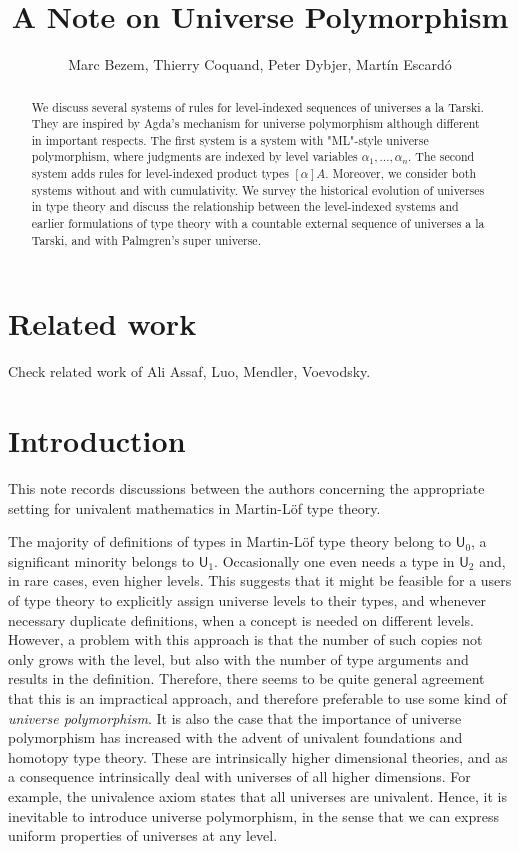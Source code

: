 \documentclass[10pt,a4paper]{article}
\newcommand{\U}{\mathsf{U}}
\begin{document}
\title{A Note on Universe Polymorphism}

\author{Marc Bezem, Thierry Coquand, Peter Dybjer, Mart\'in Escard\'o}
\date{}
\maketitle

\begin{abstract}
We discuss several systems of rules for level-indexed sequences of universes a la Tarski. They are inspired by Agda's mechanism for universe polymorphism although different in important respects. The first system is a system with "ML"-style universe polymorphism, where judgments are indexed by level variables $\alpha_1, \ldots, \alpha_n$. The second system adds rules for level-indexed product types $[\alpha]A$. Moreover, we consider both systems without and with cumulativity. We survey the historical evolution of universes in type theory and discuss the relationship between the level-indexed systems and earlier formulations of type theory with a countable external sequence of universes a la Tarski, and with Palmgren's super universe. 
\end{abstract}

\section{Related work}

Check related work of Ali Assaf, Luo, Mendler, Voevodsky.

\section{Introduction}

This note records discussions between the authors concerning the appropriate setting for univalent mathematics in Martin-Löf type theory. 

The majority of definitions of types in Martin-Löf type theory belong to $\U_0$, a significant minority belongs to $\U_1$. Occasionally one even needs a type in $\U_2$ and, in rare cases, even higher levels. This suggests that it might be feasible for a users of type theory to explicitly assign universe levels to their types, and whenever necessary duplicate definitions, when a concept is needed on different levels. However, a problem with this approach is that the number of such copies not only grows with the level, but also with the number of type arguments and results in the definition. Therefore, there seems to be quite general agreement that this is an impractical approach, and therefore preferable to use some kind of {\em universe polymorphism}. It is also the case that the importance of universe polymorphism has increased with the advent of univalent foundations and homotopy type theory. These are intrinsically higher dimensional theories, and as a consequence intrinsically deal with universes of all higher dimensions. For example, the univalence axiom states that all universes are univalent. Hence, it is inevitable to introduce universe polymorphism, in the sense that we can express uniform properties of universes at any level.
\end{document}
